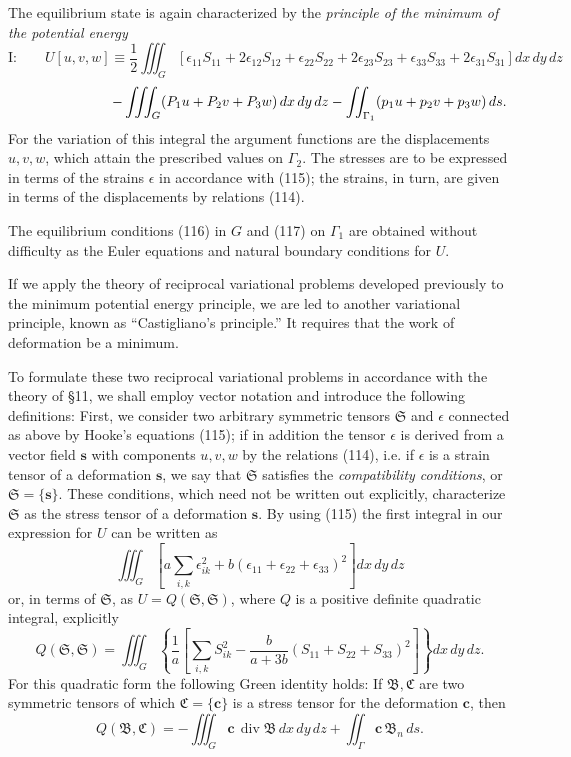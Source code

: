 The equilibrium state is again characterized by the \emph{principle of the minimum of the potential energy}
\[
\text{I:}\qquad U[u,v,w]\equiv
\frac12\iiint_G\left[\epsilon_{11}S_{11}+2\epsilon_{12}S_{12}+\epsilon_{22}S_{22}+2\epsilon_{23}S_{23}+\epsilon_{33}S_{33}+2\epsilon_{31}S_{31}\right]dx\,dy\,dz
\]
\[
\hspace{2.5cm}-\iiint_G(P_1u+P_2v+P_3w)\,dx\,dy\,dz
-\iint_{\Gamma_1}(p_1u+p_2v+p_3w)\,ds.
\]
For the variation of this integral the argument functions are the displacements $u,v,w$, which attain the prescribed values on $\Gamma_2$. The stresses are to be expressed in terms of the strains $\epsilon$ in accordance with (115); the strains, in turn, are given in terms of the displacements by relations (114).

The equilibrium conditions (116) in $G$ and (117) on $\Gamma_1$ are obtained without difficulty as the Euler equations and natural boundary conditions for $U$.

If we apply the theory of reciprocal variational problems developed previously to the minimum potential energy principle, we are led to another variational principle, known as ``Castigliano's principle.'' It requires that the work of deformation be a minimum.

To formulate these two reciprocal variational problems in accordance with the theory of \S11, we shall employ vector notation and introduce the following definitions: First, we consider two arbitrary symmetric tensors $\mathfrak S$ and $\epsilon$ connected as above by Hooke's equations (115); if in addition the tensor $\epsilon$ is derived from a vector field $\mathbf s$ with components $u,v,w$ by the relations (114), i.e. if $\epsilon$ is a strain tensor of a deformation $\mathbf s$, we say that $\mathfrak S$ satisfies the \emph{compatibility conditions}, or $\mathfrak S=\{\mathbf s\}$. These conditions, which need not be written out explicitly, characterize $\mathfrak S$ as the stress tensor of a deformation $\mathbf s$. By using (115) the first integral in our expression for $U$ can be written as
\[
\iiint_G\left[a\sum_{i,k}\epsilon_{ik}^2+b(\epsilon_{11}+\epsilon_{22}+\epsilon_{33})^2\right]dx\,dy\,dz
\]
or, in terms of $\mathfrak S$, as $U=Q(\mathfrak S,\mathfrak S)$, where $Q$ is a positive definite quadratic integral, explicitly
\begin{equation}\tag{119}
Q(\mathfrak S,\mathfrak S)=\iiint_G\left\{\frac1a\left[\sum_{i,k}S_{ik}^2-\frac{b}{a+3b}(S_{11}+S_{22}+S_{33})^2\right]\right\}dx\,dy\,dz.
\end{equation}
For this quadratic form the following Green identity holds: If $\mathfrak B,\mathfrak C$ are two symmetric tensors of which $\mathfrak C=\{\mathbf c\}$ is a stress tensor for the deformation $\mathbf c$, then
\begin{equation}\tag{120}
Q(\mathfrak B,\mathfrak C)=-\iiint_G\mathbf c\,\operatorname{div}\mathfrak B\,dx\,dy\,dz+\iint_\Gamma \mathbf c\,\mathfrak B_n\,ds.
\end{equation}

